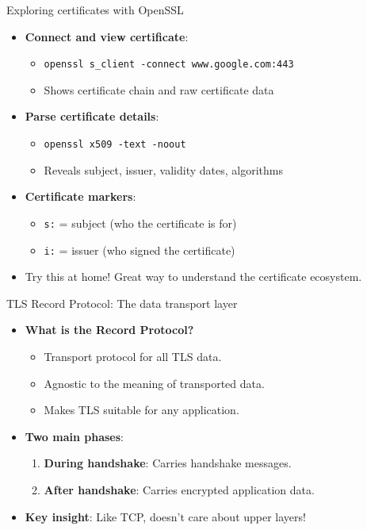 \documentclass[aspectratio=169, lualatex, handout]{beamer}
\begin{document}
\begin{frame}{Exploring certificates with OpenSSL}
	\begin{itemize}[<+->]
		\item \textbf{Connect and view certificate}:
		      \begin{itemize}
			      \item \texttt{openssl s\_client -connect www.google.com:443}
			      \item Shows certificate chain and raw certificate data
		      \end{itemize}
		\item \textbf{Parse certificate details}:
		      \begin{itemize}
			      \item \texttt{openssl x509 -text -noout}
			      \item Reveals subject, issuer, validity dates, algorithms
		      \end{itemize}
		\item \textbf{Certificate markers}:
		      \begin{itemize}
			      \item \texttt{s:} = subject (who the certificate is for)
			      \item \texttt{i:} = issuer (who signed the certificate)
		      \end{itemize}
		\item Try this at home! Great way to understand the certificate ecosystem.
	\end{itemize}
\end{frame}

\begin{frame}{TLS Record Protocol: The data transport layer}
	\begin{itemize}[<+->]
		\item \textbf{What is the Record Protocol?}
		      \begin{itemize}
			      \item Transport protocol for all TLS data.
			      \item Agnostic to the meaning of transported data.
			      \item Makes TLS suitable for any application.
		      \end{itemize}
		\item \textbf{Two main phases}:
		      \begin{enumerate}
			      \item \textbf{During handshake}: Carries handshake messages.
			      \item \textbf{After handshake}: Carries encrypted application data.
		      \end{enumerate}
		\item \textbf{Key insight}: Like TCP, doesn't care about upper layers!
	\end{itemize}
\end{frame}
\end{document}
